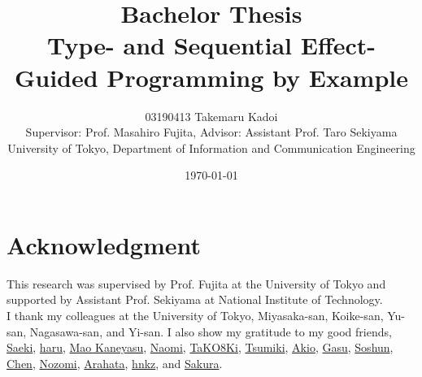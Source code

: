 \documentclass[12pt, a4paper, titlepage]{report}
\title{
  Bachelor Thesis \\
  Type- and Sequential Effect-Guided Programming by Example
}
\author{
  03190413 Takemaru Kadoi
  \\[1cm]
  {\small Supervisor: Prof. Masahiro Fujita},
  {\small Advisor: Assistant Prof. Taro Sekiyama}
  \\[1cm]
  {\small University of Tokyo, Department of Information and Communication Engineering}
}
\date{\today}
\begin{document}


\maketitle
\newpage
\tableofcontents
\newpage

\chapter*{Acknowledgment}
This research was supervised by Prof. Fujita at the University of Tokyo and supported by Assistant Prof. Sekiyama at National Institute of Technology. \\
I thank my colleagues at the University of Tokyo, Miyasaka-san, Koike-san, Yu-san, Nagasawa-san, and Yi-san.
I also show my gratitude to my good friends,
  \href{https://twitter.com/97sktk}{Saeki},
  \href{https://twitter.com/9SKEgI72RcOWxB8}{haru},
  \href{https://twitter.com/LdCqh1}{Mao Kaneyasu},
  \href{https://twitter.com/NaomiatLibrary}{Naomi},
  \href{https://twitter.com/TaKOBKi}{TaKO8Ki},
  \href{https://twitter.com/Tmstmput}{Tsumiki},
  \href{https://twitter.com/akio_utsuroido}{Akio},
  \href{https://twitter.com/gasukkkgesu}{Gasu},
  \href{https://twitter.com/hamburg_soshun}{Soshun},
  \href{https://twitter.com/macrokoala}{Chen},
  \href{https://twitter.com/nozo_moto}{Nozomi},
  \href{https://twitter.com/readonly_true}{Arahata},
  \href{https://twitter.com/wan__nyan__wan}{hnkz},
  and
  \href{https://twitter.com/cheripori}{Sakura}.

\end{document}
